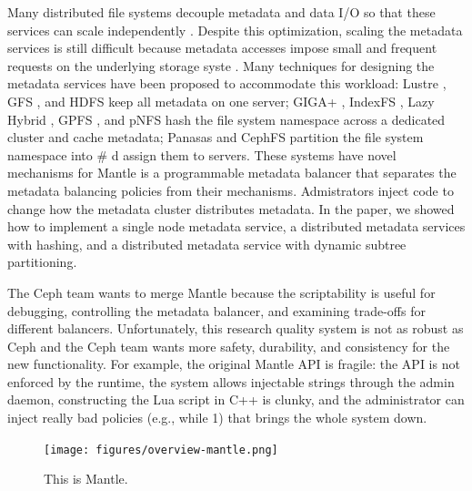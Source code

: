 \documentclass[10pt,twocolumn]{article}
\begin{document}
Many distributed file systems decouple metadata and data I/O so that
these services can scale independently \autocites[
]{alam:pdsw2011-metadata-scaling}[ ]{ghemawat:sosp2003-gfs}[
]{hildebrand:msst2005-pnfs}[ ]{weil_ceph_2006}[
]{welch:fast2008-panasas}{shvachko:login2012-hdfs-scalability}. Despite
this optimization, scaling the metadata services is still difficult
because metadata accesses impose small and frequent requests on the
underlying storage syste \autocite{roselli:atec2000-FS-workloads}. Many
techniques for designing the metadata services have been proposed to
accommodate this workload: Lustre
\autocite{konstantinos:pdsw2014-lustre-metadata}, GFS
\autocite{ghemawat:sosp2003-gfs}, and HDFS
\autocite{shvachko:login2012-hdfs-scalability} keep all metadata on one
server; GIGA+ \autocite{patil:fast2011-giga}, IndexFS
\autocite{ren:sc2014-indexfs}, Lazy Hybrid
\autocite{brandt:msst2003-lh}, GPFS \autocite{schmuck:fast2002-gpfs},
and pNFS \autocite{hildebrand:supercomputing2006-pNFS} hash the file
system namespace across a dedicated cluster and cache metadata; Panasas
\autocite{welch:fast2008-panasas} and CephFS
\autocite{weil:sc2004-dyn-metadata} partition the file system namespace
into \# d assign them to servers. These systems have novel mechanisms
for Mantle \autocite{sevilla:sc15-mantle} is a programmable metadata
balancer that separates the metadata balancing policies from their
mechanisms. Admistrators inject code to change how the metadata cluster
distributes metadata. In the paper, we showed how to implement a single
node metadata service, a distributed metadata services with hashing, and
a distributed metadata service with dynamic subtree partitioning.

The Ceph team wants to merge Mantle because the scriptability is useful
for debugging, controlling the metadata balancer, and examining
trade-offs for different balancers. Unfortunately, this research quality
system is not as robust as Ceph and the Ceph team wants more safety,
durability, and consistency for the new functionality. For example, the
original Mantle API is fragile: the API is not enforced by the runtime,
the system allows injectable strings through the admin daemon,
constructing the Lua script in C++ is clunky, and the administrator can
inject really bad policies (e.g., while 1) that brings the whole system
down.

\begin{figure}[htbp]
\centering
\texttt{[image: figures/overview-mantle.png]}
\caption{This is Mantle.}
\end{figure}
\end{document}
